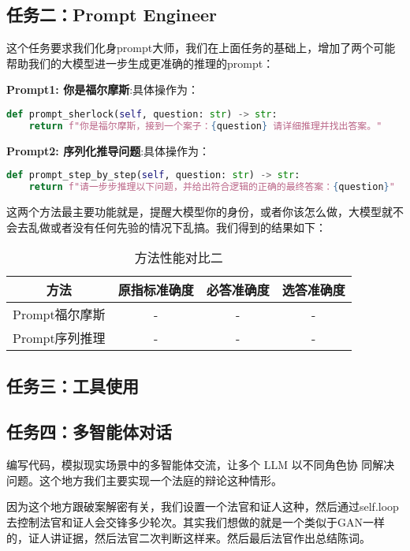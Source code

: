 \documentclass[answers]{exam}  %
\begin{document}
\subsection{任务二：Prompt Engineer}

这个任务要求我们化身prompt大师，我们在上面任务的基础上，增加了两个可能帮助我们的大模型进一步生成更准确的推理的prompt：

\textbf{Prompt1: 你是福尔摩斯}:具体操作为：
\begin{lstlisting}[language=python]
    def prompt_sherlock(self, question: str) -> str:
    return f"你是福尔摩斯，接到一个案子：{question} 请详细推理并找出答案。"
\end{lstlisting}

\textbf{Prompt2: 序列化推导问题}:具体操作为：
\begin{lstlisting}[language=python]
    def prompt_step_by_step(self, question: str) -> str:
    return f"请一步步推理以下问题，并给出符合逻辑的正确的最终答案：{question}"
\end{lstlisting}

这两个方法最主要功能就是，提醒大模型你的身份，或者你该怎么做，大模型就不会去乱做或者没有任何先验的情况下乱搞。我们得到的结果如下：

\begin{table}[h]
    \centering
    \begin{tabular}{cccc}
    \toprule
    \textbf{方法} & \textbf{原指标准确度} & \textbf{必答准确度} &\textbf{选答准确度}\\
    \midrule
    Prompt福尔摩斯 & - & - & - \\
    \hline
    Prompt序列推理 & - & - & - \\
    \bottomrule
    \end{tabular}
    \caption{方法性能对比二}
\end{table}


\subsection{任务三：工具使用}

\subsection{任务四：多智能体对话}

编写代码，模拟现实场景中的多智能体交流，让多个 LLM 以不同角色协
同解决问题。这个地方我们主要实现一个法庭的辩论这种情形。

因为这个地方跟破案解密有关，我们设置一个法官和证人这种，然后通过self.loop去控制法官和证人会交锋多少轮次。其实我们想做的就是一个类似于GAN一样的，证人讲证据，然后法官二次判断这样来。然后最后法官作出总结陈词。
\end{document}
